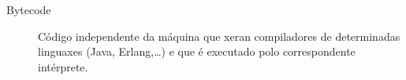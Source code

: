 \chapter*{\nomeglosariotermos}
\label{chap:glosario-termos}


\begin{description}
 \item [Bytecode] Código independente da máquina que xeran
   compiladores de determinadas linguaxes (Java, Erlang,\dots) e que
   é executado polo correspondente intérprete.
\end{description}
